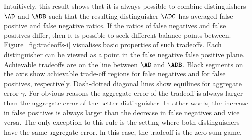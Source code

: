 \documentclass{crypto-exercise}
\begin{document}
\begin{solution}
Intuitively, this result shows that it is always possible to combine distinguishers $\AD$ and $\ADB$ such that the resulting distinguisher $\ADC$ has averaged false positive and false negative ratios. If the ratios of false negatives and false positives differ, then it is possible to seek different balance points between. Figure~\ref{fig:tradeoffs-i} visualises basic properties of such tradeoffs. Each distinguisher can be viewed as a point in the false negative false positive plane. Achievable tradeoffs are on the line between $\AD$ and $\ADB$. Black segments on the axis show achievable trade-off regions for false negatives and for false positives, respectively. Dash-dotted diagonal lines show equilines for aggregate error $\gamma$. For obvious reasons the aggregate error of the tradeoff is always larger than the aggregate error of the better distinguisher. In other words, the increase in false positives is always larger than the decrease in false negatives and vice versa. The only exception to this rule is the setting where both distinguishers have the same aggregate error. In this case, the tradeoff is the zero sum game.  

\begin{figure}[H]
\begin{center} 
\end{center}
\end{figure}
\end{solution}
\end{document}
